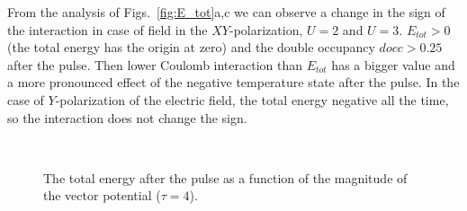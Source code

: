 From the analysis of Figs.~\ref{fig:E_tot}a,c we can observe a change in the sign of the interaction in case of field in the $XY$-polarization, $U=2$ and $U=3$. $E_{tot}>0$ (the total energy has the origin at zero) and the double occupancy $docc>0.25$ after the pulse. Then lower Coulomb interaction than $E_{tot}$ has a bigger value and a more pronounced effect of the negative temperature state after the pulse. In the case of $Y$-polarization of the electric field, the total energy negative all the time, so the interaction does not change the sign.
\begin{figure}[h!]
 \\
\caption{The total energy after the pulse as a function of the magnitude of the vector potential ($\tau = 4$).}
\label{fig:E_tot_A}
\end{figure}

